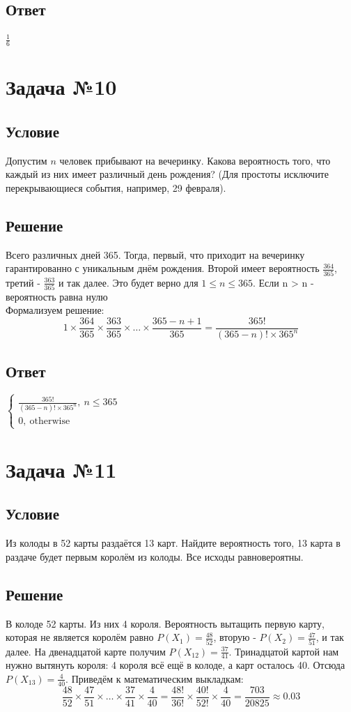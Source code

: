 \documentclass{article}
\begin{document}
\subsection*{Ответ}
$\frac{1}{6}$
\section*{Задача №10}
\subsection*{Условие}
Допустим $n$ человек прибывают на вечеринку. Какова вероятность того, что
каждый из них имеет различный день рождения? (Для простоты исключите
перекрывающиеся события, например, 29 февраля). 
\subsection*{Решение}
Всего различных дней 365. Тогда, первый, что приходит на вечеринку гарантированно с уникальным днём рождения. Второй имеет вероятность $\frac{364}{365}$, третий - $\frac{363}{365}$ и так далее. Это будет верно для $1\le n \le 365 $. Если n > n - вероятность равна нулю\\
Формализуем решение:
\[
    1 \times \frac{364}{365} \times \frac{363}{365} \times \dots \times \frac{365 - n + 1}{365} = \frac{365!}{(365 - n)! \times 365^n}
\]
\subsection*{Ответ}
$\begin{cases}
    \frac{365!}{(365 - n)! \times 365^n}, \ n \le 365 \\
    0, \ \text{otherwise}
\end{cases}$

\section*{Задача №11}
\subsection*{Условие}
Из колоды в 52 карты раздаётся 13 карт. Найдите вероятность того, 13
карта в раздаче будет первым королём из колоды. Все исходы равновероятны. 
\subsection*{Решение}
В колоде 52 карты. Из них 4 короля. Вероятность вытащить первую  карту, которая не является королём равно $P(X_1)=\frac{48}{52}$, вторую - $P(X_2)=\frac{47}{51}$, и так далее. На двенадцатой карте получим $P(X_{12})=\frac{37}{41}$. Тринадцатой картой нам нужно вытянуть короля: 4 короля всё ещё в колоде, а карт осталось 40. Отсюда $P(X_{13})=\frac{4}{40}$.
Приведём к математическим выкладкам:
\[
    \frac{48}{52} \times \frac{47}{51} \times \dots \times \frac{37}{41} \times \frac{4}{40} = \frac{48!}{36!}\times\frac{40!}{52!}\times\frac{4}{40} = \frac{703}{20825} \approx 0.03
\]
\end{document}

